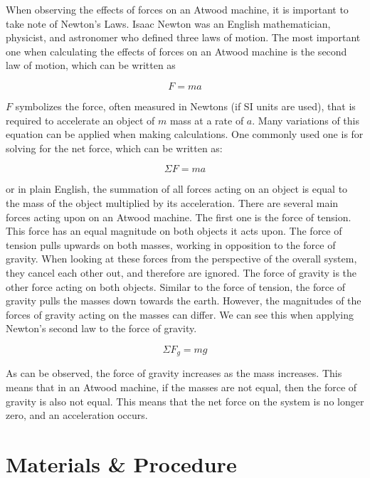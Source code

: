 \documentclass[10pt,twocolumn,letterpaper]{article}
\begin{document}
When observing the effects of forces on an Atwood machine, it is important to take note of Newton's Laws. Isaac Newton was an English mathematician, physicist, and astronomer who defined three laws of motion. The most important one when calculating the effects of forces on an Atwood machine is the second law of motion, which can be written as 

\begin{equation}
    F = ma
\end{equation}

\(F\) symbolizes the force, often measured in Newtons (if SI units are used), that is required to accelerate an object of \(m\) mass at a rate of \(a\). Many variations of this equation can be applied when making calculations. One commonly used one is for solving for the net force, which can be written as:

\begin{equation}
    \Sigma F = ma
\end{equation}

or in plain English, the summation of all forces acting on an object is equal to the mass of the object multiplied by its acceleration. There are several main forces acting upon on an Atwood machine. The first one is the force of tension. This force has an equal magnitude on both objects it acts upon. The force of tension pulls upwards on both masses, working in opposition to the force of gravity. When looking at these forces from the perspective of the overall system, they cancel each other out, and therefore are ignored. The force of gravity is the other force acting on both objects. Similar to the force of tension, the force of gravity pulls the masses down towards the earth. However, the magnitudes of the forces of gravity acting on the masses can differ. We can see this when applying Newton's second law to the force of gravity. 

\begin{equation}
    \Sigma F_{g} = mg
\end{equation}

As can be observed, the force of gravity increases as the mass increases. This means that in an Atwood machine, if the masses are not equal, then the force of gravity is also not equal. This means that the net force on the system is no longer zero, and an acceleration occurs.

\section{Materials \& Procedure}
\end{document}
